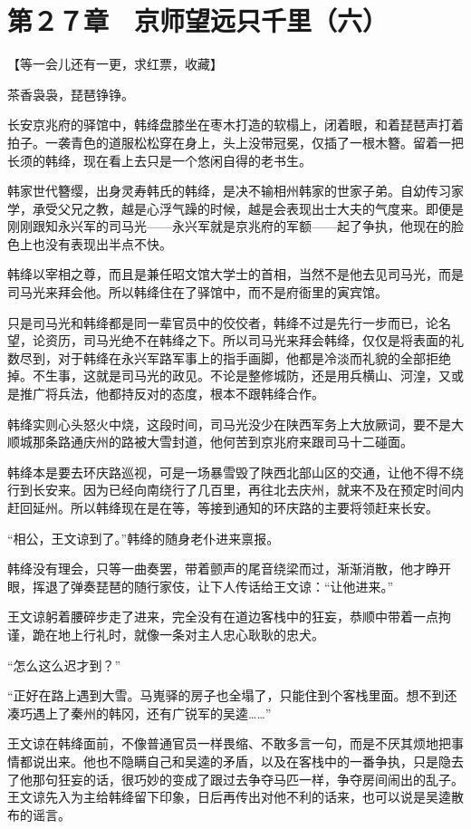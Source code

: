 \section{第２７章　京师望远只千里（六）}

【等一会儿还有一更，求红票，收藏】

茶香袅袅，琵琶铮铮。

长安京兆府的驿馆中，韩绛盘膝坐在枣木打造的软榻上，闭着眼，和着琵琶声打着拍子。一袭青色的道服松松穿在身上，头上没带冠冕，仅插了一根木簪。留着一把长须的韩绛，现在看上去只是一个悠闲自得的老书生。

韩家世代簪缨，出身灵寿韩氏的韩绛，是决不输相州韩家的世家子弟。自幼传习家学，承受父兄之教，越是心浮气躁的时候，越是会表现出士大夫的气度来。即便是刚刚跟知永兴军的司马光——永兴军就是京兆府的军额——起了争执，他现在的脸色上也没有表现出半点不快。

韩绛以宰相之尊，而且是兼任昭文馆大学士的首相，当然不是他去见司马光，而是司马光来拜会他。所以韩绛住在了驿馆中，而不是府衙里的寅宾馆。

只是司马光和韩绛都是同一辈官员中的佼佼者，韩绛不过是先行一步而已，论名望，论资历，司马光绝不在韩绛之下。所以司马光来拜会韩绛，仅仅是将表面的礼数尽到，对于韩绛在永兴军路军事上的指手画脚，他都是冷淡而礼貌的全部拒绝掉。不生事，这就是司马光的政见。不论是整修城防，还是用兵横山、河湟，又或是推广将兵法，他都持反对的态度，根本不跟韩绛合作。

韩绛实则心头怒火中烧，这段时间，司马光没少在陕西军务上大放厥词，要不是大顺城那条路通庆州的路被大雪封道，他何苦到京兆府来跟司马十二碰面。

韩绛本是要去环庆路巡视，可是一场暴雪毁了陕西北部山区的交通，让他不得不绕行到长安来。因为已经向南绕行了几百里，再往北去庆州，就来不及在预定时间内赶回延州。所以韩绛现在是在等，等接到通知的环庆路的主要将领赶来长安。

“相公，王文谅到了。”韩绛的随身老仆进来禀报。

韩绛没有理会，只等一曲奏罢，带着颤声的尾音绕梁而过，渐渐消散，他才睁开眼，挥退了弹奏琵琶的随行家伎，让下人传话给王文谅：“让他进来。”

王文谅躬着腰碎步走了进来，完全没有在道边客栈中的狂妄，恭顺中带着一点拘谨，跪在地上行礼时，就像一条对主人忠心耿耿的忠犬。

“怎么这么迟才到？”

“正好在路上遇到大雪。马嵬驿的房子也全塌了，只能住到个客栈里面。想不到还凑巧遇上了秦州的韩冈，还有广锐军的吴逵……”

王文谅在韩绛面前，不像普通官员一样畏缩、不敢多言一句，而是不厌其烦地把事情都说出来。他也不隐瞒自己和吴逵的矛盾，以及在客栈中的一番争执，只是隐去了他那句狂妄的话，很巧妙的变成了跟过去争夺马匹一样，争夺房间闹出的乱子。王文谅先入为主给韩绛留下印象，日后再传出对他不利的话来，也可以说是吴逵散布的谣言。

